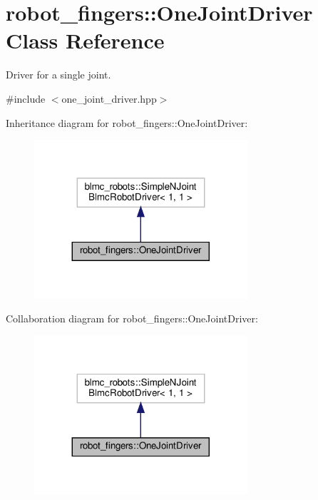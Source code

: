 \hypertarget{classrobot__fingers_1_1OneJointDriver}{}\section{robot\+\_\+fingers\+:\+:One\+Joint\+Driver Class Reference}
\label{classrobot__fingers_1_1OneJointDriver}


Driver for a single joint.  




{\ttfamily \#include $<$one\+\_\+joint\+\_\+driver.\+hpp$>$}



Inheritance diagram for robot\+\_\+fingers\+:\+:One\+Joint\+Driver\+:
\nopagebreak
\begin{figure}[H]
\begin{center}
\leavevmode
\includegraphics[width=224pt]{classrobot__fingers_1_1OneJointDriver__inherit__graph}
\end{center}
\end{figure}


Collaboration diagram for robot\+\_\+fingers\+:\+:One\+Joint\+Driver\+:
\nopagebreak
\begin{figure}[H]
\begin{center}
\leavevmode
\includegraphics[width=224pt]{classrobot__fingers_1_1OneJointDriver__coll__graph}
\end{center}
\end{figure}
